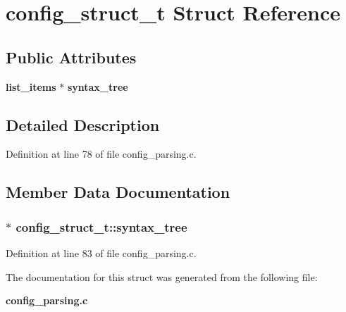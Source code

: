 \section{config\_\-struct\_\-t Struct Reference}
\label{structconfig__struct__t}
\subsection*{Public Attributes}
\begin{CompactItemize}
\item 
{\bf list\_\-items} $\ast$ {\bf syntax\_\-tree}
\end{CompactItemize}


\subsection{Detailed Description}


Definition at line 78 of file config\_\-parsing.c.

\subsection{Member Data Documentation}
\subsubsection[{syntax\_\-tree}]{$\ast$ {\bf config\_\-struct\_\-t::syntax\_\-tree}}\label{structconfig__struct__t_2fb873f65294aa91fe5a3481dda831df}




Definition at line 83 of file config\_\-parsing.c.

The documentation for this struct was generated from the following file:\begin{CompactItemize}
\item 
{\bf config\_\-parsing.c}\end{CompactItemize}
